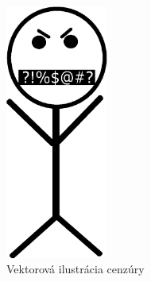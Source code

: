 \documentclass{artikel1}
\begin{document}
\begin{figure}[htbp]
    \begin{center}
        \includegraphics[width=0.30\textwidth]{censored-person.eps}
    \end{center}
    \caption{Vektorová ilustrácia cenzúry}
    \label{censored-nospeaking}
\end{figure}

\printbibliography[heading=bibintoc]
\begingroup
\let\clearpage\relax
\printindex
\endgroup
\end{document}
